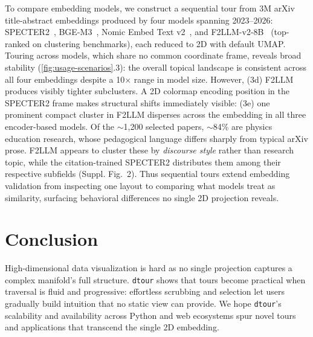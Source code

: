 \documentclass{vgtc}
\newcommand{\dtour}{\texorpdfstring{\texttt{dtour}\xspace}{dtour}}
\begin{document}
To compare embedding models, we construct a sequential tour from 3M arXiv title-abstract embeddings produced by four models spanning 2023--2026: SPECTER2~\cite{singh2023scirepeval}, BGE-M3~\cite{chen2024bgem3}, Nomic Embed Text v2~\cite{nussbaum2025nomic}, and F2LLM-v2-8B~\cite{zhang2026f2llmv2} (top-ranked on clustering benchmarks), each reduced to 2D with default UMAP. Touring across models, which share no common coordinate frame, reveals broad stability (\autoref{fig:usage-scenarios}.3): the overall topical landscape is consistent across all four embeddings despite a 10$\times$ range in model size. However, (3d) F2LLM produces visibly tighter subclusters. A 2D colormap encoding position in the SPECTER2 frame makes structural shifts immediately visible: (3e) one prominent compact cluster in F2LLM disperses across the embedding in all three encoder-based models. Of the ${\sim}$1,200 selected papers, ${\sim}$84\% are physics education research, whose pedagogical language differs sharply from typical arXiv prose. F2LLM appears to cluster these by \emph{discourse style} rather than research topic, while the citation-trained SPECTER2 distributes them among their respective subfields (Suppl. Fig.~2). Thus sequential tours extend embedding validation from inspecting one layout to comparing what models treat as similarity, surfacing behavioral differences no single 2D projection reveals.


\section{Conclusion}
\label{sec:conclusion}

High-dimensional data visualization is hard as no single projection captures a complex manifold's full structure. \dtour{} shows that tours become practical when traversal is fluid and progressive: effortless scrubbing and selection let users gradually build intuition that no static view can provide. We hope \dtour{}'s scalability and availability across Python and web ecosystems spur novel tours and applications that transcend the single 2D embedding.





\end{document}
